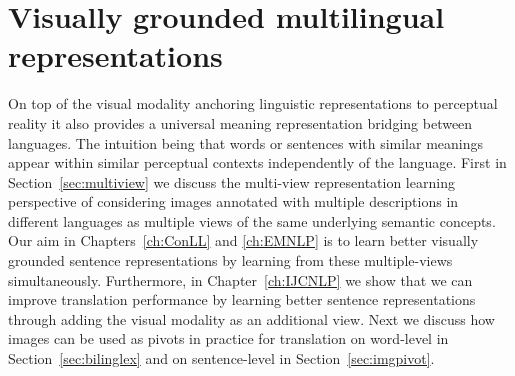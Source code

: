 
\section{Visually grounded multilingual representations}
\label{sec:vismulti}

On top of the visual modality anchoring linguistic representations to perceptual reality it
also provides a universal meaning representation bridging between languages.
The  intuition being that words or sentences with similar meanings appear
within similar perceptual contexts independently of the language.
First in Section~\ref{sec:multiview} we discuss
the multi-view representation learning perspective of considering images annotated
with multiple descriptions in different languages as multiple views of the
same underlying semantic concepts.
Our aim in Chapters~\ref{ch:ConLL} and \ref{ch:EMNLP} is to learn
better visually grounded sentence representations by learning from these multiple-views
simultaneously. Furthermore, in Chapter~\ref{ch:IJCNLP} we show that we can improve
translation performance by learning better sentence representations through  adding the visual
modality as an additional view.
Next we discuss how images can be used as pivots in practice for translation on word-level in
Section~\ref{sec:bilinglex} and on sentence-level in Section~\ref{sec:imgpivot}.

